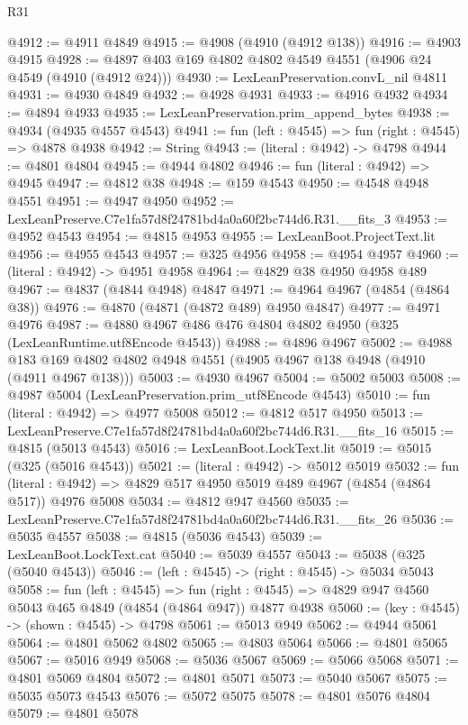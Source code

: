 \begin{lexlean}{R31}
\begin{coremodule}
@4912 := @4911 @4849
@4915 := @4908 (@4910 (@4912 @138))
@4916 := @4903 @4915
@4928 := @4897 @403 @169 @4802 @4802 @4549 @4551 (@4906 @24 @4549 (@4910 (@4912 @24)))
@4930 := LexLeanPreservation.convL_nil @4811
@4931 := @4930 @4849
@4932 := @4928 @4931
@4933 := @4916 @4932
@4934 := @4894 @4933
@4935 := LexLeanPreservation.prim_append_bytes
@4938 := @4934 (@4935 @4557 @4543)
@4941 := fun (left : @4545) => fun (right : @4545) => @4878 @4938
@4942 := String
@4943 := (literal : @4942) -> @4798
@4944 := @4801 @4804
@4945 := @4944 @4802
@4946 := fun (literal : @4942) => @4945
@4947 := @4812 @38
@4948 := @159 @4543
@4950 := @4548 @4948 @4551
@4951 := @4947 @4950
@4952 := LexLeanPreserve.C7e1fa57d8f24781bd4a0a60f2bc744d6.R31.__fits_3
@4953 := @4952 @4543
@4954 := @4815 @4953
@4955 := LexLeanBoot.ProjectText.lit
@4956 := @4955 @4543
@4957 := @325 @4956
@4958 := @4954 @4957
@4960 := (literal : @4942) -> @4951 @4958
@4964 := @4829 @38 @4950 @4958 @489
@4967 := @4837 (@4844 @4948) @4847
@4971 := @4964 @4967 (@4854 (@4864 @38))
@4976 := @4870 (@4871 (@4872 @489) @4950 @4847)
@4977 := @4971 @4976
@4987 := @4880 @4967 @486 @476 @4804 @4802 @4950 (@325 (LexLeanRuntime.utf8Encode @4543))
@4988 := @4896 @4967
@5002 := @4988 @183 @169 @4802 @4802 @4948 @4551 (@4905 @4967 @138 @4948 (@4910 (@4911 @4967 @138)))
@5003 := @4930 @4967
@5004 := @5002 @5003
@5008 := @4987 @5004 (LexLeanPreservation.prim_utf8Encode @4543)
@5010 := fun (literal : @4942) => @4977 @5008
@5012 := @4812 @517 @4950
@5013 := LexLeanPreserve.C7e1fa57d8f24781bd4a0a60f2bc744d6.R31.__fits_16
@5015 := @4815 (@5013 @4543)
@5016 := LexLeanBoot.LockText.lit
@5019 := @5015 (@325 (@5016 @4543))
@5021 := (literal : @4942) -> @5012 @5019
@5032 := fun (literal : @4942) => @4829 @517 @4950 @5019 @489 @4967 (@4854 (@4864 @517)) @4976 @5008
@5034 := @4812 @947 @4560
@5035 := LexLeanPreserve.C7e1fa57d8f24781bd4a0a60f2bc744d6.R31.__fits_26
@5036 := @5035 @4557
@5038 := @4815 (@5036 @4543)
@5039 := LexLeanBoot.LockText.cat
@5040 := @5039 @4557
@5043 := @5038 (@325 (@5040 @4543))
@5046 := (left : @4545) -> (right : @4545) -> @5034 @5043
@5058 := fun (left : @4545) =>
  fun (right : @4545) => @4829 @947 @4560 @5043 @465 @4849 (@4854 (@4864 @947)) @4877 @4938
@5060 := (key : @4545) -> (shown : @4545) -> @4798
@5061 := @5013 @949
@5062 := @4944 @5061
@5064 := @4801 @5062 @4802
@5065 := @4803 @5064
@5066 := @4801 @5065
@5067 := @5016 @949
@5068 := @5036 @5067
@5069 := @5066 @5068
@5071 := @4801 @5069 @4804
@5072 := @4801 @5071
@5073 := @5040 @5067
@5075 := @5035 @5073 @4543
@5076 := @5072 @5075
@5078 := @4801 @5076 @4804
@5079 := @4801 @5078

\end{coremodule}
\end{lexlean}
